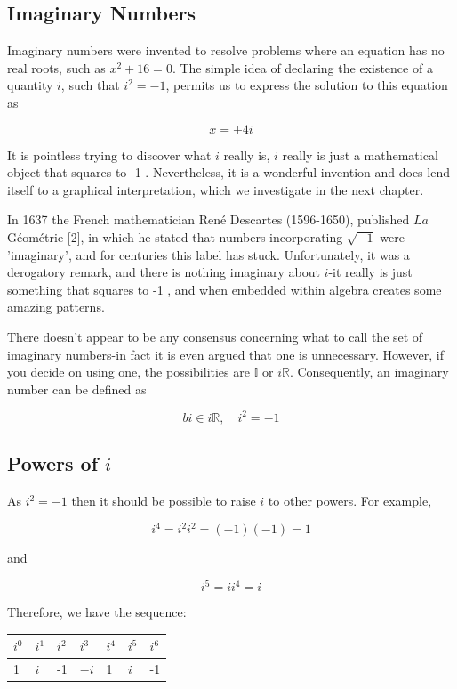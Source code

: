 \documentclass[10pt]{article}
\begin{document}
\subsection{Imaginary Numbers}
Imaginary numbers were invented to resolve problems where an equation has no real roots, such as $x^{2}+16=0$. The simple idea of declaring the existence of a quantity $i$, such that $i^{2}=-1$, permits us to express the solution to this equation as

$$
x= \pm 4 i
$$

It is pointless trying to discover what $i$ really is, $i$ really is just a mathematical object that squares to -1 . Nevertheless, it is a wonderful invention and does lend itself to a graphical interpretation, which we investigate in the next chapter.

In 1637 the French mathematician René Descartes (1596-1650), published $L a$ Géométrie [2], in which he stated that numbers incorporating $\sqrt{-1}$ were 'imaginary', and for centuries this label has stuck. Unfortunately, it was a derogatory remark, and there is nothing imaginary about $i$-it really is just something that squares to -1 , and when embedded within algebra creates some amazing patterns.

There doesn't appear to be any consensus concerning what to call the set of imaginary numbers-in fact it is even argued that one is unnecessary. However, if you decide on using one, the possibilities are $\mathbb{I}$ or $i \mathbb{R}$. Consequently, an imaginary number can be defined as

$$
b i \in i \mathbb{R}, \quad i^{2}=-1
$$

\subsection{Powers of $i$}
As $i^{2}=-1$ then it should be possible to raise $i$ to other powers. For example,

$$
i^{4}=i^{2} i^{2}=(-1)(-1)=1
$$

and

$$
i^{5}=i i^{4}=i
$$

Therefore, we have the sequence:

\begin{center}
\begin{tabular}{lllllll}
\hline
$i^{0}$ & $i^{1}$ & $i^{2}$ & $i^{3}$ & $i^{4}$ & $i^{5}$ & $i^{6}$ \\
\hline
1 & $i$ & -1 & $-i$ & 1 & $i$ & -1 \\
\hline
\end{tabular}
\end{center}
\end{document}
